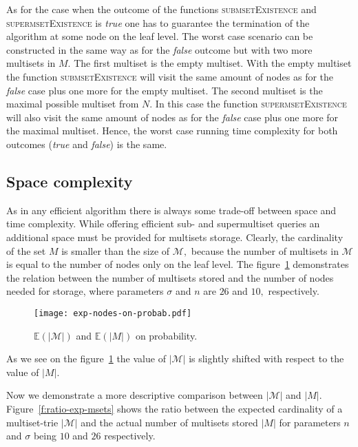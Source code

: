 As for the case when the outcome of the functions \textsc{submsetExistence} and 
\textsc{supermsetExistence} is \emph{true} one has to guarantee the termination 
of the algorithm at some node on the leaf level. The worst case scenario can be 
constructed in the same way as for the \emph{false} outcome but with two more 
multisets in $M.$ The first multiset is the empty multiset. With the empty multiset 
the function \textsc{submsetExistence} will visit the same amount of nodes as for 
the \emph{false} case plus one more for the empty multiset. The second multiset 
is the maximal possible multiset from $N.$ In this case the function \textsc{supermsetExistence} 
will also visit the same amount of nodes as for the \emph{false} case plus one more 
for the maximal multiset. Hence, the worst case running time complexity for both 
outcomes (\emph{true} and \emph{false}) is the same.

\subsection{Space complexity}\label{s:spacecomplexity}
As in any efficient algorithm there is always some trade-off between space and 
time complexity. While offering efficient sub- and supermultiset queries an 
additional space must be provided for multisets storage. Clearly, the cardinality 
of the set $M$ is smaller than the size of $\mathcal{M},$ because the number 
of multisets in $\mathcal{M}$ is equal to the number of nodes only on the leaf 
level. The figure~\ref{f:exp-nodes} demonstrates the relation between the number 
of multisets stored and the number of nodes needed for storage, where parameters 
$\sigma$ and $n$ are $26$ and $10,$ respectively.

\begin{figure}[h!]
\center
\texttt{[image: exp-nodes-on-probab.pdf]}
\caption{$\mathbb{E}(|\mathcal{M}|)$ and $\mathbb{E}(|M|)$ on probability.}
\label{f:exp-nodes}
\end{figure}

As we see on the figure~\ref{f:exp-nodes} the value of $|\mathcal{M}|$ is slightly 
shifted with respect to the value of $|M|.$

Now we demonstrate a more descriptive comparison between $|\mathcal{M}|$ and 
$|M|.$ Figure~\ref{f:ratio-exp-msets} shows the ratio between the expected cardinality 
of a multiset-trie $|\mathcal{M}|$ and the actual number of multisets stored $|M|$ for 
parameters $n$ and $\sigma$ being $10$ and $26$ respectively.

